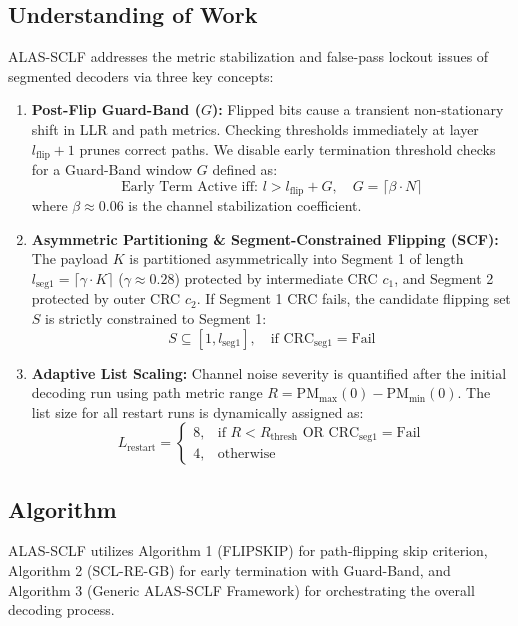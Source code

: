 \documentclass[journal,10pt,twocolumn]{IEEEtran}
\begin{document}
\subsection{Understanding of Work}
ALAS-SCLF addresses the metric stabilization and false-pass lockout issues of segmented decoders via three key concepts:
\begin{enumerate}
    \item \textbf{Post-Flip Guard-Band ($G$):} Flipped bits cause a transient non-stationary shift in LLR and path metrics. Checking thresholds immediately at layer $l_{\text{flip}} + 1$ prunes correct paths. We disable early termination threshold checks for a Guard-Band window $G$ defined as:
    \begin{equation}
    \text{Early Term Active iff: } l > l_{\text{flip}} + G, \quad G = \lceil \beta \cdot N \rceil
    \end{equation}
    where $\beta \approx 0.06$ is the channel stabilization coefficient.
    
    \item \textbf{Asymmetric Partitioning \& Segment-Constrained Flipping (SCF):} The payload $K$ is partitioned asymmetrically into Segment 1 of length $l_{\text{seg1}} = \lceil \gamma \cdot K \rceil$ ($\gamma \approx 0.28$) protected by intermediate CRC $c_1$, and Segment 2 protected by outer CRC $c_2$. If Segment 1 CRC fails, the candidate flipping set $S$ is strictly constrained to Segment 1:
    \begin{equation}
    S \subseteq [1, l_{\text{seg1}}], \quad \text{if } \text{CRC}_{\text{seg1}} = \text{Fail}
    \end{equation}
    
    \item \textbf{Adaptive List Scaling:} Channel noise severity is quantified after the initial decoding run using path metric range $R = \text{PM}_{\text{max}}(0) - \text{PM}_{\text{min}}(0)$. The list size for all restart runs is dynamically assigned as:
    \begin{equation}
    L_{\text{restart}} = \begin{cases} 8, & \text{if } R < R_{\text{thresh}} \text{ OR } \text{CRC}_{\text{seg1}} = \text{Fail} \\ 4, & \text{otherwise} \end{cases}
    \end{equation}
\end{enumerate}

\subsection{Algorithm}
ALAS-SCLF utilizes Algorithm 1 (FLIPSKIP) for path-flipping skip criterion, Algorithm 2 (SCL-RE-GB) for early termination with Guard-Band, and Algorithm 3 (Generic ALAS-SCLF Framework) for orchestrating the overall decoding process.
\end{document}

